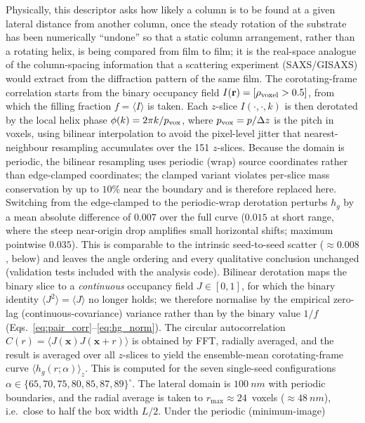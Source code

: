 \documentclass[aip,amsmath,amssymb,reprint]{revtex4-1}
\newcommand{\dang}{\ensuremath{\alpha}}
\begin{document}
Physically, this descriptor asks how likely a column is to be found at a
given lateral distance from another column, once the steady rotation of
the substrate has been numerically ``undone'' so that a static column
arrangement, rather than a rotating helix, is being compared from film to
film; it is the real-space analogue of the column-spacing information
that a scattering experiment (SAXS/GISAXS) would extract from the
diffraction pattern of the same film.
The corotating-frame correlation starts from the binary occupancy field
$I(\mathbf{r}) = [\rho_{\rm voxel} > 0.5]$, from which the filling fraction
$f = \langle I \rangle$ is taken.
Each $z$-slice $I(\cdot,\cdot,k)$ is then derotated by the local helix
phase $\phi(k) = 2\pi k/p_{\rm vox}$, where $p_{\rm vox} = p/\Delta z$
is the pitch in voxels, using bilinear interpolation to avoid the
pixel-level jitter that nearest-neighbour resampling accumulates over
the 151 $z$-slices.  Because the domain is periodic, the bilinear
resampling uses periodic (wrap) source coordinates rather than
edge-clamped coordinates; the clamped variant violates per-slice mass
conservation by up to $10\%$ near the boundary and is therefore replaced
here.  Switching from the edge-clamped to the periodic-wrap derotation
perturbs $h_g$ by a mean absolute difference of $0.007$ over the full curve
($0.015$ at short range, where the steep near-origin drop amplifies small
horizontal shifts; maximum pointwise $0.035$).  This is comparable to the
intrinsic seed-to-seed scatter ($\approx0.008$, below) and leaves the
angle ordering and every qualitative conclusion unchanged
(validation tests included with the analysis code).
Bilinear derotation maps the binary slice to a \emph{continuous} occupancy
field $J\in[0,1]$, for which the binary identity $\langle J^2\rangle=\langle
J\rangle$ no longer holds; we therefore normalise by the empirical
zero-lag (continuous-covariance) variance rather than by the binary
value $1/f$ (Eqs.~\ref{eq:pair_corr}--\ref{eq:hg_norm}).
The circular autocorrelation $C(r)=\langle J(\mathbf{x})J(\mathbf{x}+r)\rangle$
is obtained by FFT, radially averaged, and the result is averaged over all
$z$-slices to yield the ensemble-mean corotating-frame curve
$\langle h_g(r;\dang)\rangle_z$.
This is computed for the seven single-seed configurations
$\dang \in \{65, 70, 75, 80, 85, 87, 89\}^{\circ}$.
The lateral domain is $\SI{100}{nm}$ with periodic boundaries, and the radial
average is taken to $r_{\max}\approx 24$~voxels ($\approx\SI{48}{nm}$), i.e.\
close to half the box width $L/2$.  Under the periodic (minimum-image)
\end{document}
